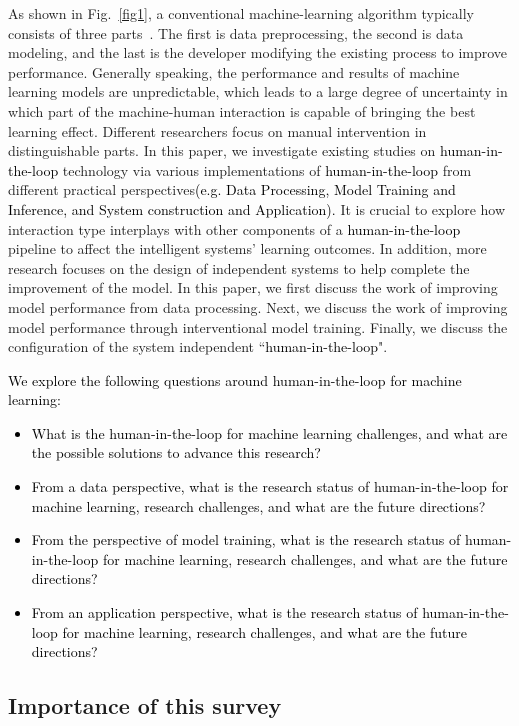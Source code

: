 \documentclass{article}
\newcommand{\REO}[1]{\textcolor{black}{#1}}
\newcommand{\ZJH}[1]{\textcolor{black}{#1}}
\begin{document}
As shown in Fig.~\ref{fig1}, a conventional machine-learning algorithm typically consists of three parts~\cite{xin2018accelerating}.
The first is data preprocessing, the second is data modeling, and the last is the developer modifying the existing process to improve performance.
Generally speaking, the performance and results of machine learning models are unpredictable, which leads to a large degree of uncertainty in which part of the machine-human interaction is capable of bringing the best learning effect.
Different researchers focus on manual intervention in distinguishable parts.
In this paper, we investigate existing studies on \REO{human-in-the-loop} technology via various implementations of \REO{human-in-the-loop} from different practical perspectives\ZJH{(e.g. Data Processing, Model Training and Inference, and System construction and Application).}
It is crucial to explore how interaction type interplays with other components of a \REO{human-in-the-loop} pipeline to affect the intelligent systems' learning outcomes.
In addition, more research focuses on the design of independent systems to help complete the improvement of the model.
In this paper, we first discuss the work of improving model performance from data processing.
Next, we discuss the work of improving model performance through interventional model training.
Finally, we discuss the configuration of the system independent ``\REO{human-in-the-loop}".


\REO{
We \ZJH{explore} the following questions around human-in-the-loop for machine learning:
\begin{itemize}
\setlength{\itemsep}{0pt}
\setlength{\parsep}{0pt}
\setlength{\parskip}{0pt}
\item What is the human-in-the-loop for machine learning challenges, and what are the possible solutions to advance this research?
\item From a data perspective, what is the research status of human-in-the-loop for machine learning, research challenges, and what are the future directions?
\item From the perspective of model training, what is the research status of human-in-the-loop for machine learning, research challenges, and what are the future directions?
\item From an application perspective, what is the research status of human-in-the-loop for machine learning, research challenges, and what are the future directions?
\end{itemize}
}

\subsection{Importance of this survey}
\end{document}
